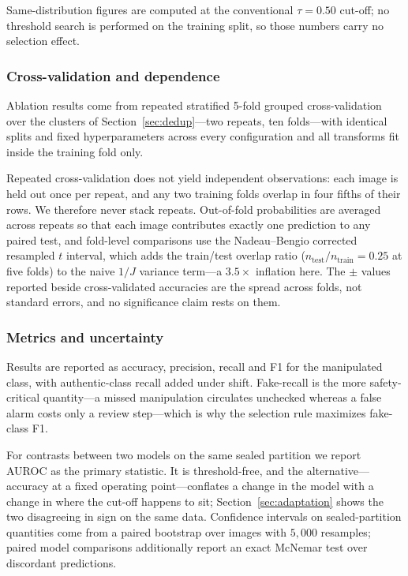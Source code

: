 Same-distribution figures are computed at the conventional $\tau = 0.50$
cut-off; no threshold search is performed on the training split, so those
numbers carry no selection effect.

\subsubsection{Cross-validation and dependence}
Ablation results come from repeated stratified 5-fold grouped cross-validation
over the clusters of Section~\ref{sec:dedup}---two repeats, ten folds---with
identical splits and fixed hyperparameters across every configuration and all
transforms fit inside the training fold only.

Repeated cross-validation does not yield independent observations: each image
is held out once per repeat, and any two training folds overlap in four fifths
of their rows. We therefore never stack repeats. Out-of-fold probabilities are
averaged across repeats so that each image contributes exactly one prediction
to any paired test, and fold-level comparisons use the Nadeau--Bengio corrected
resampled $t$ interval, which adds the train/test overlap ratio
($n_{\text{test}}/n_{\text{train}} = 0.25$ at five folds) to the naive $1/J$
variance term---a $3.5\times$ inflation here. The $\pm$ values reported beside
cross-validated accuracies are the spread across folds, not standard errors,
and no significance claim rests on them.

\subsubsection{Metrics and uncertainty}
Results are reported as accuracy, precision, recall and F1 for the manipulated
class, with authentic-class recall added under shift. Fake-recall is the more
safety-critical quantity---a missed manipulation circulates unchecked whereas a
false alarm costs only a review step---which is why the selection rule
maximizes fake-class F1.

For contrasts between two models on the same sealed partition we report AUROC
as the primary statistic. It is threshold-free, and the alternative---accuracy
at a fixed operating point---conflates a change in the model with a change in
where the cut-off happens to sit; Section~\ref{sec:adaptation} shows the two
disagreeing in sign on the same data. Confidence intervals on sealed-partition
quantities come from a paired bootstrap over images with $5{,}000$ resamples;
paired model comparisons additionally report an exact McNemar test over
discordant predictions.

